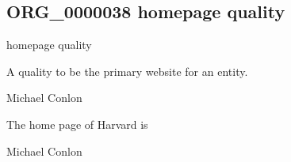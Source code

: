 \documentclass[letterpaper,10pt,english]{sphinxmanual}
\begin{document}
\subsection{ORG\_0000038 \sphinxhyphen{} homepage quality}
\label{\detokenize{doc-ORG_0000038:org-0000038-homepage-quality}}\label{\detokenize{doc-ORG_0000038:index-0}}\label{\detokenize{doc-ORG_0000038::doc}}
\begin{sphinxShadowBox}

\sphinxAtStartPar
homepage quality
\end{sphinxShadowBox}

\begin{sphinxShadowBox}

\sphinxAtStartPar
{\hyperref[\detokenize{doc-BFO_0000019::doc}]{}}
\end{sphinxShadowBox}

\begin{sphinxShadowBox}

\sphinxAtStartPar
A quality to be the primary website for an entity.
\end{sphinxShadowBox}

\begin{sphinxShadowBox}

\sphinxAtStartPar
Michael Conlon 
\end{sphinxShadowBox}

\begin{sphinxShadowBox}

\sphinxAtStartPar
The home page of Harvard is 
\end{sphinxShadowBox}

\begin{sphinxShadowBox}

\sphinxAtStartPar
Michael Conlon 
\end{sphinxShadowBox}
\begin{quote}

\ignorespaces \end{quote}
\end{document}
